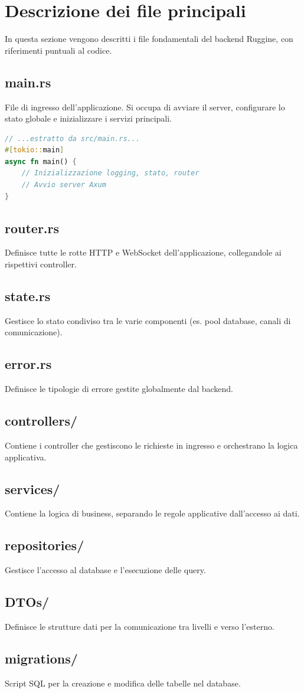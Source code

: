 \chapter{Descrizione dei file principali}

In questa sezione vengono descritti i file fondamentali del backend Ruggine, con riferimenti puntuali al codice.

\section{main.rs}
File di ingresso dell'applicazione. Si occupa di avviare il server, configurare lo stato globale e inizializzare i servizi principali.

\begin{lstlisting}[language=Rust, caption={Avvio del server in main.rs}]
// ...estratto da src/main.rs...
#[tokio::main]
async fn main() {
    // Inizializzazione logging, stato, router
    // Avvio server Axum
}
\end{lstlisting}

\section{router.rs}
Definisce tutte le rotte HTTP e WebSocket dell'applicazione, collegandole ai rispettivi controller.

\section{state.rs}
Gestisce lo stato condiviso tra le varie componenti (es. pool database, canali di comunicazione).

\section{error.rs}
Definisce le tipologie di errore gestite globalmente dal backend.

\section{controllers/}
Contiene i controller che gestiscono le richieste in ingresso e orchestrano la logica applicativa.

\section{services/}
Contiene la logica di business, separando le regole applicative dall'accesso ai dati.

\section{repositories/}
Gestisce l'accesso al database e l'esecuzione delle query.

\section{DTOs/}
Definisce le strutture dati per la comunicazione tra livelli e verso l'esterno.

\section{migrations/}
Script SQL per la creazione e modifica delle tabelle nel database.